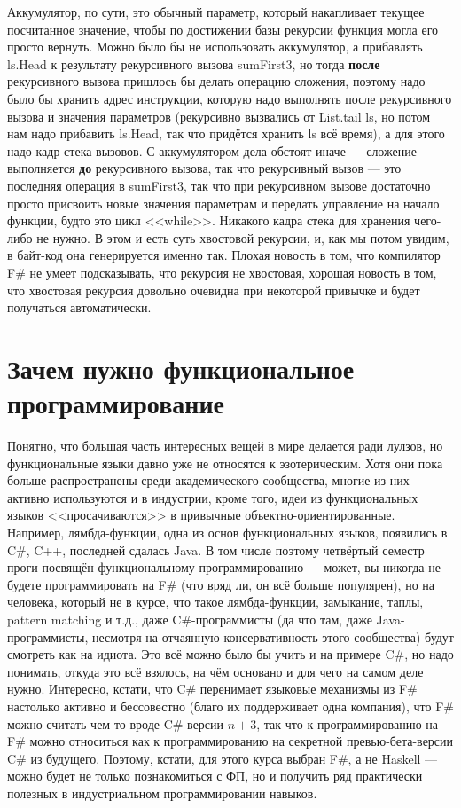 \documentclass[a5paper]{article}
\begin{document}
Аккумулятор, по сути, это обычный параметр, который накапливает текущее посчитанное значение, чтобы по достижении базы рекурсии функция могла его просто вернуть. Можно было бы не использовать аккумулятор, а прибавлять ls.Head к результату рекурсивного вызова sumFirst3, но тогда \textbf{после} рекурсивного вызова пришлось бы делать операцию сложения, поэтому надо было бы хранить адрес инструкции, которую надо выполнять после рекурсивного вызова и значения параметров (рекурсивно вызвались от List.tail ls, но потом нам надо прибавить ls.Head, так что придётся хранить ls всё время), а для этого надо кадр стека вызовов. С аккумулятором дела обстоят иначе --- сложение выполняется \textbf{до} рекурсивного вызова, так что рекурсивный вызов --- это последняя операция в sumFirst3, так что при рекурсивном вызове достаточно просто присвоить новые значения параметрам и передать управление на начало функции, будто это цикл <<while>>. Никакого кадра стека для хранения чего-либо не нужно. В этом и есть суть хвостовой рекурсии, и, как мы потом увидим, в байт-код она генерируется именно так. Плохая новость в том, что компилятор F\# не умеет подсказывать, что рекурсия не хвостовая, хорошая новость в том, что хвостовая рекурсия довольно очевидна при некоторой привычке и будет получаться автоматически.

\section{Зачем нужно функциональное программирование}

Понятно, что большая часть интересных вещей в мире делается ради лулзов, но функциональные языки давно уже не относятся к эзотерическим. Хотя они пока больше распространены среди академического сообщества, многие из них активно используются и в индустрии, кроме того, идеи из функциональных языков <<просачиваются>> в привычные объектно-ориентированные. Например, лямбда-функции, одна из основ функциональных языков, появились в C\#, C++, последней сдалась Java. В том числе поэтому четвёртый семестр проги посвящён функциональному программированию --- может, вы никогда не будете программировать на F\# (что вряд ли, он всё больше популярен), но на человека, который не в курсе, что такое лямбда-функции, замыкание, таплы, pattern matching и т.д., даже C\#-программисты (да что там, даже Java-программисты, несмотря на отчаянную консервативность этого сообщества) будут смотреть как на идиота. Это всё можно было бы учить и на примере C\#, но надо понимать, откуда это всё взялось, на чём основано и для чего на самом деле нужно. Интересно, кстати, что C\# перенимает языковые механизмы из F\# настолько активно и бессовестно (благо их поддерживает одна компания), что F\# можно считать чем-то вроде C\# версии $n + 3$, так что к программированию на F\# можно относиться как к программированию на секретной превью-бета-версии C\# из будущего. Поэтому, кстати, для этого курса выбран F\#, а не Haskell --- можно будет не только познакомиться с ФП, но и получить ряд практически полезных в индустриальном программировании навыков.
\end{document}
